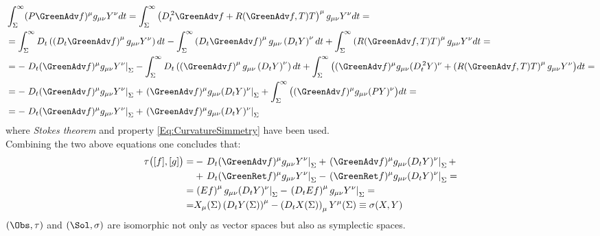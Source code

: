 \documentclass[Main]{subfiles}
\begin{document}
		\begin{align}
			&\int_\Sigma^\infty (P \GreenAdv f)^\mu g_{\mu \nu} Y^\nu dt = \int_\Sigma^\infty \left( D_t^{\,2} \GreenAdv f +R(\GreenAdv f,T)T \right)^\mu g_{\mu \nu} Y^\nu dt = \nonumber \\
			&= 
			 \int_\Sigma^\infty D_t \left( \left(D_t  \GreenAdv f \right)^\mu g_{\mu \nu} Y^\nu \right)dt -
			 \int_\Sigma^\infty \left( D_t  \GreenAdv f \right)^\mu g_{\mu \nu} \left( D_t Y \right)^\nu dt +
			 \int_\Sigma^\infty \left( R( \GreenAdv f,T)T \right)^\mu g_{\mu \nu} Y^\nu dt = \nonumber \\
			&= 
			 - \left. D_t( \GreenAdv f)^\mu g_{\mu \nu} Y^\nu \right\vert_\Sigma -
			 \int_\Sigma^\infty D_t \left( \left( \GreenAdv f \right)^\mu g_{\mu \nu} \left( D_t Y \right)^\nu \right)dt + \int_\Sigma^\infty \big(
			 (\GreenAdv f)^\mu g_{\mu \nu} (D_t^{\, 2}Y)^\nu + 
			 \left(R( \GreenAdv f,T)T \right)^\mu g_{\mu \nu} Y^\nu
			 \big) dt	=	 \nonumber \\
			 &=
			 -   \left. D_t( \GreenAdv f)^\mu g_{\mu \nu} Y^\nu \right\vert_\Sigma
			 +  \left. ( \GreenAdv f)^\mu g_{\mu \nu} (D_t Y)^\nu \right\vert_\Sigma
			 + \int_\Sigma^\infty \big(
			 (\GreenAdv f)^\mu g_{\mu \nu} (P Y)^\nu 
			 \big) dt =\nonumber \\
			 &= 
			 -   \left. D_t( \GreenAdv f)^\mu g_{\mu \nu} Y^\nu \right\vert_\Sigma
			 +  \left. ( \GreenAdv f)^\mu g_{\mu \nu} (D_t Y)^\nu \right\vert_\Sigma
		\end{align}
		where \emph{Stokes theorem} and property \ref{Eq:CurvatureSimmetry} have been used.
		\\
		Combining the two above equations one concludes that:
		\begin{align}
		\tau\big( [f], [g] \big) =& 
			 -   \left. D_t( \GreenAdv f)^\mu g_{\mu \nu} Y^\nu \right\vert_\Sigma
			 +  \left. ( \GreenAdv f)^\mu g_{\mu \nu} (D_t Y)^\nu \right\vert_\Sigma		+
		\nonumber \\
			&+ \left. D_t( \GreenRet f)^\mu g_{\mu \nu} Y^\nu \right\vert_\Sigma
			   -  \left. ( \GreenRet f)^\mu g_{\mu \nu} (D_t Y)^\nu \right\vert_\Sigma		
		 =  \nonumber\\
		=&\left. \left( E f \right)^\mu g_{\mu \nu} ( D_t Y)^\nu\right\vert_\Sigma	 
		-  \left.\left(D_t E f \right)^\mu g_{\mu \nu}  Y^\nu \right\vert_\Sigma	= \nonumber \\
		=& X_\mu(\Sigma) \left( D_t Y (\Sigma)\right)^\mu - \left(D_t X(\Sigma)\right)_\mu Y^\mu(\Sigma) \equiv \sigma( X, Y)
		\end{align}
		$(\Obs, \tau)$ and $(\Sol, \sigma)$ are isomorphic not only as vector spaces but also as symplectic spaces.
\end{document}
